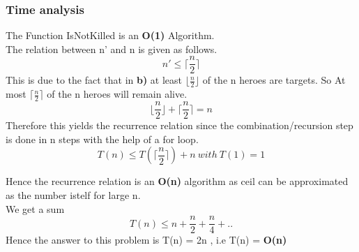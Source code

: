 \documentclass{report}
\begin{document}
 \subsubsection{Time analysis}
 The Function IsNotKilled is an \textbf{O(1)} Algorithm.\\
 The relation between n' and n is given as follows.\\
 \begin{equation*}
     n' \leq \lceil\frac{n}{2}\rceil
 \end{equation*}
 This is due to the fact that in \textbf{b)} at least $\lfloor\frac{n}{2}\rfloor$ of the n heroes are targets. So At most $\lceil\frac{n}{2}\rceil$ of the n heroes will remain alive.
 \begin{equation*}
     \lfloor\frac{n}{2}\rfloor + \lceil\frac{n}{2}\rceil = n
 \end{equation*}
 Therefore this yields the recurrence relation since the combination/recursion step is done in n steps with the help of a for loop.
 \begin{equation*}
     T(n) \leq T(\lceil\frac{n}{2}\rceil) + n \ with \ T(1) = 1
 \end{equation*}
  \begin{center} 
\end{center}
Hence the recurrence relation is an \textbf{O(n)} algorithm as ceil can be approximated as the number istelf for large n.\\
We get a sum 
\begin{equation*}
    T(n) \leq n + \frac{n}{2} + \frac{n}{4} + ..
\end{equation*}
Hence the answer to this problem is T(n) = 2n , i.e T(n) = \textbf{O(n)}
\end{document}
